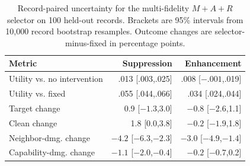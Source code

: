 \begin{table}[t]
\centering
\small
\setlength{\tabcolsep}{2.8pt}
\caption{Record-paired uncertainty for the multi-fidelity $M+A+R$
selector on 100 held-out records. Brackets are 95\% intervals from 10,000
record bootstrap resamples. Outcome changes are selector-minus-fixed in
percentage points.}
\label{tab:selector-bootstrap}
\begin{tabular*}{\columnwidth}{@{\extracolsep{\fill}}lrr@{}}
\toprule
Metric & Suppression & Enhancement \\
\midrule
Utility vs. no intervention & .013 [.003,.025] & .008 [$-.001$,.019] \\
Utility vs. fixed & .055 [.044,.066] & .034 [.024,.044] \\
Target change & 0.9 [$-1.3$,3.0] & $-0.8$ [$-2.6$,1.1] \\
Clean change & 1.8 [0.0,3.8] & $-0.2$ [$-1.9$,1.8] \\
Neighbor-dmg. change & $-4.2$ [$-6.3$,$-2.3$] & $-3.0$ [$-4.9$,$-1.4$] \\
Capability-dmg. change & $-1.1$ [$-2.0$,$-0.4$] & $-0.2$ [$-0.7$,0.2] \\
\bottomrule
\end{tabular*}

\end{table}
